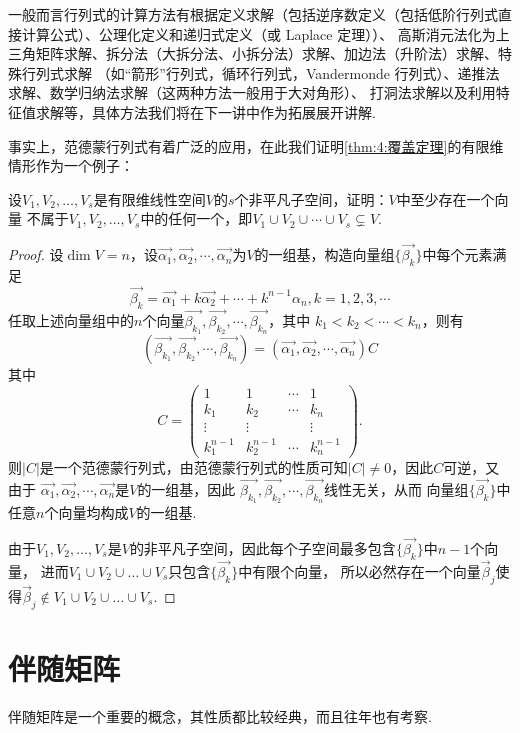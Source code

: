 一般而言行列式的计算方法有根据定义求解（包括逆序数定义（包括低阶行列式直接计算公式）、公理化定义和递归式定义（或 Laplace 定理））、
高斯消元法化为上三角矩阵求解、拆分法（大拆分法、小拆分法）求解、加边法（升阶法）求解、特殊行列式求解
（如``箭形''行列式，循环行列式，Vandermonde 行列式）、递推法求解、数学归纳法求解（这两种方法一般用于大对角形）、
打洞法求解以及利用特征值求解等，具体方法我们将在下一讲中作为拓展展开讲解.

事实上，范德蒙行列式有着广泛的应用，在此我们证明\autoref{thm:4:覆盖定理}的有限维情形作为一个例子：
\begin{example}\label{ex:11:行列式证明覆盖定理}
    设$V_1,V_2,\ldots,V_s$是有限维线性空间$V$的$s$个非平凡子空间，证明：$V$中至少存在一个向量
    不属于$V_1,V_2,\ldots,V_s$中的任何一个，即$V_1 \cup V_2 \cup \cdots \cup V_s\subsetneq V.$
\end{example}
\begin{proof}
    设$\dim V=n$，设$\vec{\alpha_1},\vec{\alpha_2},\cdots,\vec{\alpha_n}$为$V$的一组基，构造向量组$\{\vec{\beta_k}\}$中每个元素满足
    \[\vec{\beta_k}=\vec{\alpha_1}+k\vec{\alpha_2}+\cdots+k^{n-1}\alpha_n,k=1,2,3,\cdots\]
    任取上述向量组中的$n$个向量$\vec{\beta_{k_1}},\vec{\beta_{k_2}},\cdots,\vec{\beta_{k_n}}$，其中
    $k_1<k_2<\cdots<k_n$，则有
    \[(\vec{\beta_{k_1}},\vec{\beta_{k_2}},\cdots,\vec{\beta_{k_n}})=(\vec{\alpha_1},\vec{\alpha_2},\cdots,\vec{\alpha_n})C\]
    其中
    \[C=\begin{pmatrix}
        1 & 1 & \cdots & 1 \\
        k_1 & k_2 & \cdots & k_n \\
        \vdots & \vdots &  & \vdots \\
        k_1^{n-1} & k_2^{n-1} & \cdots & k_n^{n-1}
    \end{pmatrix}.\]
    则$|C|$是一个范德蒙行列式，由范德蒙行列式的性质可知$|C| \neq 0$，因此$C$可逆，又由于
    $\vec{\alpha_1},\vec{\alpha_2},\cdots,\vec{\alpha_n}$是$V$的一组基，因此
    $\vec{\beta_{k_1}},\vec{\beta_{k_2}},\cdots,\vec{\beta_{k_n}}$线性无关，从而
    向量组$\{\vec{\beta_k}\}$中任意$n$个向量均构成$V$的一组基.

    由于$V_1,V_2,\ldots,V_s$是$V$的非平凡子空间，因此每个子空间最多包含$\{\vec{\beta_k}\}$中$n-1$个向量，
    进而$V_1\cup V_2\cup\ldots\cup V_s$只包含$\{\vec{\beta_k}\}$中有限个向量，
    所以必然存在一个向量$\vec{\beta}_j$使得$\vec{\beta}_j \notin V_1\cup V_2\cup\ldots\cup V_s$.
\end{proof}

\section{伴随矩阵}
伴随矩阵是一个重要的概念，其性质都比较经典，而且往年也有考察.
